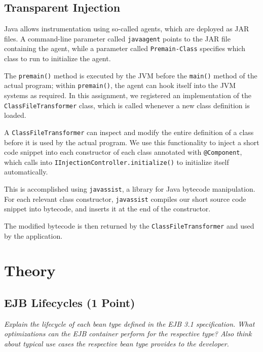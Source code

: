 \documentclass[a4paper,10pt]{article}
\begin{document}
\subsection{Transparent Injection}

Java allows instrumentation using so-called agents, which are deployed as JAR files.
A command-line parameter called \verb|javaagent| points to the JAR file containing the agent, while
a parameter called \verb|Premain-Class| specifies which class to run to initialize the agent.

The \lstinline|premain()| method is executed by the JVM before the \lstinline|main()|
method of the actual program; within \lstinline|premain()|, the agent can hook itself
into the JVM systems as required. In this assignment, we registered an implementation
of the \lstinline|ClassFileTransformer| class, which is called whenever a new class
definition is loaded.

A \lstinline|ClassFileTransformer| can inspect and modify the entire definition of
a class before it is used by the actual program. We use this functionality to
inject a short code snippet into each constructor of each class annotated with \lstinline|@Component|,
which calls into \lstinline|IInjectionController.initialize()| to initialize itself
automatically.

This is accomplished using \verb|javassist|, a library for Java bytecode manipulation.
For each relevant class constructor, \verb|javassist| compiles our short source
code snippet into bytecode, and inserts it at the end of the constructor.

The modified bytecode is then returned by the \lstinline|ClassFileTransformer| and
used by the application.


\section{Theory}

\subsection{EJB Lifecycles (1 Point)}

\emph{
Explain the lifecycle of each bean type defined in the EJB 3.1 specification. What optimizations can the
EJB container perform for the respective type? Also think about typical use cases the respective bean
type provides to the developer.}

\vspace{3mm}
\end{document}
